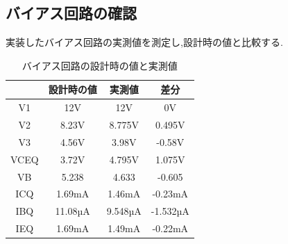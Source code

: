 \documentclass[a4j,10pt,dvipdfmx]{jarticle}
\begin{document}
\subsection{バイアス回路の確認}
実装したバイアス回路の実測値を測定し,設計時の値と比較する.
\begin{table}[H]
  \label{5}
  \begin{center}
  \caption{バイアス回路の設計時の値と実測値}
  \begin{tabular}{cccc} \\
  \hline
   & 設計時の値 & 実測値 & 差分\\\hline
  V1 & 12V & 12V & 0V \\
  V2 & 8.23V & 8.775V & 0.495V\\
  V3 & 4.56V & 3.98V & -0.58V\\
  VCEQ & 3.72V & 4.795V & 1.075V\\ 
  VB & 5.238& 4.633 & -0.605 \\
  ICQ & 1.69mA & 1.46mA&-0.23mA \\
  IBQ & 11.08µA& 9.548µA & -1.532µA\\
  IEQ & 1.69mA& 1.49mA& -0.22mA \\
  \hline
  \end{tabular}
  \end{center}
  \end{table}
\end{document}
